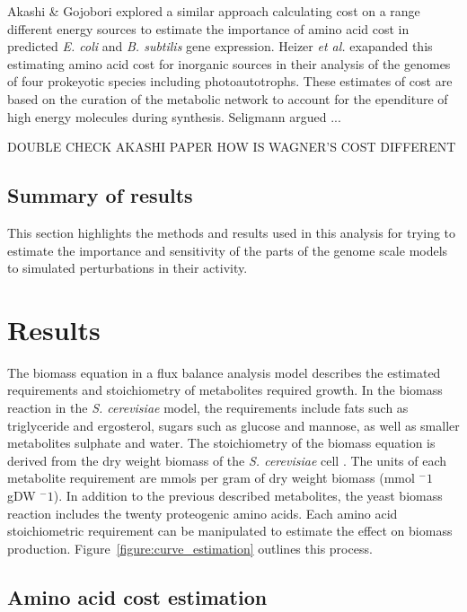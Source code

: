 Akashi \& Gojobori \cite{akashi2002} explored a similar approach calculating cost on a range different energy sources to estimate the importance of amino acid cost in predicted \emph{E. coli} and \emph{B. subtilis} gene expression. Heizer \emph{et al.} \cite{heizer} exapanded this estimating amino acid cost for inorganic sources in their analysis of the genomes of four prokeyotic species including photoautotrophs. These estimates of cost are based on the curation of the metabolic network to account for the ependiture of high energy molecules during synthesis. Seligmann argued \cite{seligmann2004} ...

DOUBLE CHECK AKASHI PAPER
HOW IS WAGNER'S COST DIFFERENT
  
\subsection{Summary of results}

This section highlights the methods and results used in this analysis for trying to estimate the importance and sensitivity of the parts of the genome scale models to simulated perturbations in their activity. 

\clearpage

\section{Results}

The biomass equation in a flux balance analysis model describes the estimated requirements and stoichiometry of metabolites required growth. In the biomass reaction in the \emph{S. cerevisiae} model, the requirements include fats such as triglyceride and ergosterol, sugars such as glucose and mannose, as well as smaller metabolites sulphate and water. The stoichiometry of the biomass equation is derived from the dry weight biomass of the \emph{S. cerevisiae} cell \cite{duarte2004}. The units of each metabolite requirement are mmols per gram of dry weight biomass (mmol $^-1$ gDW $^-1$). In addition to the previous described metabolites, the yeast biomass reaction includes the twenty proteogenic amino acids. Each amino acid stoichiometric requirement can be manipulated to estimate the effect on biomass production. Figure~\vref{figure:curve_estimation} outlines this process.

\subsection{Amino acid cost estimation}\label{section:amino_acid_cost_estimation}

